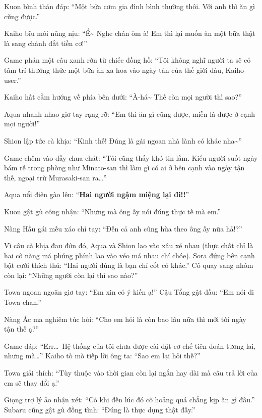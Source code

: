 \documentclass[../main.tex]{subfiles}
\begin{document}
Kuon bình thản đáp: ``Một bữa cơm gia đình bình thường thôi. Với anh thì ăn gì cũng được.''

Kaiho bĩu môi nũng nịu: ``Ể\~{} Nghe chán òm à! Em thì lại muốn ăn một bữa thật là sang chảnh đắt tiền cơ!''

Game phán một câu xanh rờn từ chiếc đồng hồ: ``Tôi không nghĩ người ta sẽ có tâm trí thưởng thức một bữa ăn xa hoa vào ngày tàn của thế giới đâu, Kaiho-user.''

Kaiho hất cằm hướng về phía bên dưới: ``À-há\~{} Thế còn mọi người thì sao?''

Aqua nhanh nhao giơ tay rạng rỡ: ``Em thì ăn gì cũng được, miễn là được ở cạnh mọi người!''

Shion lập tức cà khịa: ``Kinh thế! Đúng là gái ngoan nhà lành có khác nha\~{}''

Game chêm vào đầy chua chát: ``Tôi cũng thấy khó tin lắm. Kiểu người suốt ngày bám rễ trong phòng như Minato-san thì làm gì có ai ở bên cạnh vào ngày tận thế, ngoại trừ Murasaki-san ra\dots''

Aqua nổi điên gào lên: ``\textbf{Hai người ngậm miệng lại đi!!}''


Kuon gật gù công nhận: ``Nhưng mà ông ấy nói đúng thực tế mà em.''

Nàng Hầu gái mếu xáo chỉ tay: ``Đến cả anh cũng hùa theo ông ấy nữa hả!?''

Vì câu cà khịa đau đớn đó, Aqua và Shion lao vào xâu xé nhau (thực chất chỉ là hai cô nàng má phúng phính lao vào véo má nhau chí chóe). Sora đứng bên cạnh bật cười thích thú: ``Hai người đúng là bạn chí cốt có khác.'' Cô quay sang nhóm còn lại: ``Những người còn lại thì sao nào?''

Towa ngoan ngoãn giơ tay: ``Em xin có ý kiến ạ!'' Cậu Tổng gật đầu: ``Em nói đi Towa-chan.''

Nàng Ác ma nghiêm túc hỏi: ``Cho em hỏi là còn bao lâu nữa thì mới tới ngày tận thế ạ?''


Game đáp: ``Err\dots\ Hệ thống của tôi chưa được cài đặt cơ chế tiên đoán tương lai, nhưng mà\dots'' Kaiho tò mò tiếp lời ông ta: ``Sao em lại hỏi thế?''

Towa giải thích: ``Tùy thuộc vào thời gian còn lại ngắn hay dài mà câu trả lời của em sẽ thay đổi ạ.''

Giọng trợ lý ảo nhận xét: ``Có khi đến lúc đó cô hoảng quá chẳng kịp ăn gì đâu.'' Subaru cũng gật gù đồng tình: ``Đúng là thực dụng thật đấy.''
\end{document}
